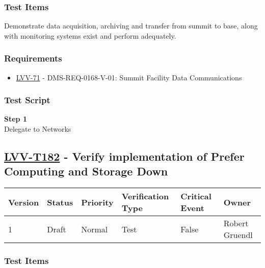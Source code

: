 \subsubsection{Test Items}\label{test-items-40}

Demonstrate data acquisition, archiving and transfer from summit to
base, along with monitoring systems exist and perform adequately.

\subsubsection{Requirements}\label{requirements-40}

\begin{itemize}
\tightlist
\item
  \href{https://jira.lsstcorp.org/browse/LVV-71}{LVV-71} -
  DMS-REQ-0168-V-01: Summit Facility Data Communications
\end{itemize}

\subsubsection{Test Script}\label{test-script-40}

\textbf{Step 1}\\
Delegate to Networks\\[2\baselineskip]

\hypertarget{lvv-t182---verify-implementation-of-prefer-computing-and-storage-down}{\subsection{\texorpdfstring{\href{https://jira.lsstcorp.org/secure/Tests.jspa\#/testCase/LVV-T182}{LVV-T182}
- Verify implementation of Prefer Computing and Storage
Down}{LVV-T182 - Verify implementation of Prefer Computing and Storage Down}}\label{lvv-t182---verify-implementation-of-prefer-computing-and-storage-down}}

\begin{longtable}[]{@{}llllll@{}}
\toprule
Version & Status & Priority & Verification Type & Critical Event &
Owner\tabularnewline
\midrule
\endhead
1 & Draft & Normal & Test & False & Robert Gruendl\tabularnewline
\bottomrule
\end{longtable}

\subsubsection{Test Items}\label{test-items-41}

